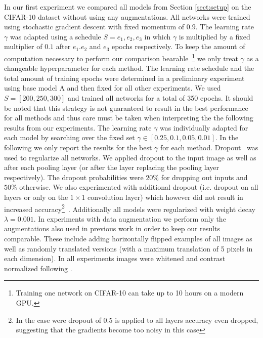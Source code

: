 \documentclass{article} %
\begin{document}
In our first experiment we compared all models from Section
\ref{sect:setup} on the CIFAR-10 dataset without using any
augmentations. All networks were trained using stochastic gradient
descent with fixed momentum of $0.9$. The learning rate $\gamma$ was adapted
using a schedule $S = {e_1, e_2, e_3}$ in which $\gamma$ is multiplied by a fixed multiplier
of $0.1$ after $e_1. e_2$ and $e_3$ epochs respectively. 
To keep the amount of computation necessary to perform
our comparison bearable~\footnote{Training one network on CIFAR-10 can
  take up to 10 hours on a modern GPU.} we only treat $\gamma$ as a
changeable hyperparameter for each method. The learning rate schedule
and the total amount of training epochs were determined in a preliminary
experiment using base model A and then fixed for all other
experiments. We used $S = [200, 250, 300]$ and trained all networks
for a total of 350 epochs. It should be noted that this strategy is not guaranteed to result in the best
performance for all methods and thus care must be taken when
interpreting the the following results from our experiments.
The learning rate $\gamma$ was individually adapted for each model by
searching over the fixed set $\gamma \in [0.25, 0.1, 0.05,
0.01]$. In the following we only report the results for the best
$\gamma$ for each method. 
Dropout~\citep{Hinton_arxiv2012} was used to regularize all networks. We
applied dropout to the input image as well as after each pooling layer
(or after the layer replacing the pooling layer respectively). The
dropout probabilities were $20 \%$ for dropping out inputs and $50 \%$
otherwise. We also experimented with additional dropout (i.e. dropout
on all layers or only on the $1\times1$ convolution layer) which
however did not result in increased accuracy\footnote{In the case were
dropout of 0.5 is applied to all layers accuracy even dropped,
suggesting that the gradients become too noisy in this case}~. 
Additionally all models were regularized with weight decay $\lambda =
0.001$. In experiments with data augmentation we perform only the
augmentations also used in previous work
\citep{Goodfellow2013,Lin_2014} in order to keep our results
comparable. These include adding horizontally flipped examples of
all images as well as randomly translated versions (with a maximum
translation of 5 pixels in each dimension). In all experiments images
were whitened and contrast normalized following \citet{Goodfellow2013}.
\end{document}
